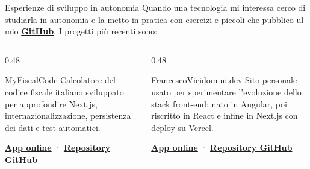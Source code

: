 \documentclass[aspectratio=169,11pt]{beamer}
\begin{document}
\begin{frame}{Esperienze di sviluppo in autonomia}
  Quando una tecnologia mi interessa cerco di studiarla in autonomia e la metto in pratica con esercizi e piccoli che pubblico ul mio \href{https://github.com/CiccioTecchio}{\textbf{GitHub}}.
  I progetti più recenti sono:

  \vspace{0.35cm}
  \begin{columns}[T,onlytextwidth]
    \begin{column}{0.48\textwidth}
      \begin{block}{MyFiscalCode}
        Calcolatore del codice fiscale italiano sviluppato per approfondire
        Next.js, internazionalizzazione, persistenza dei dati e test automatici.

        \vspace{0.25cm}
        \href{https://my-fiscal-code.vercel.app/}{\textbf{App online}}
        \quad·\quad
        \href{https://github.com/CiccioTecchio/MyFiscalCode}{\textbf{Repository GitHub}}
      \end{block}
    \end{column}
    \begin{column}{0.48\textwidth}
      \begin{block}{FrancescoVicidomini.dev}
        Sito personale usato per sperimentare l'evoluzione dello stack front-end:
        nato in Angular, poi riscritto in React e infine in Next.js con deploy su
        Vercel.

        \vspace{0.25cm}
        \href{https://francescovicidomini.dev/}{\textbf{App online}}
        \quad·\quad
        \href{https://github.com/CiccioTecchio/FrancescoVicidomini.dev}{\textbf{Repository GitHub}}
      \end{block}
    \end{column}
  \end{columns}
\end{frame}
\end{document}
